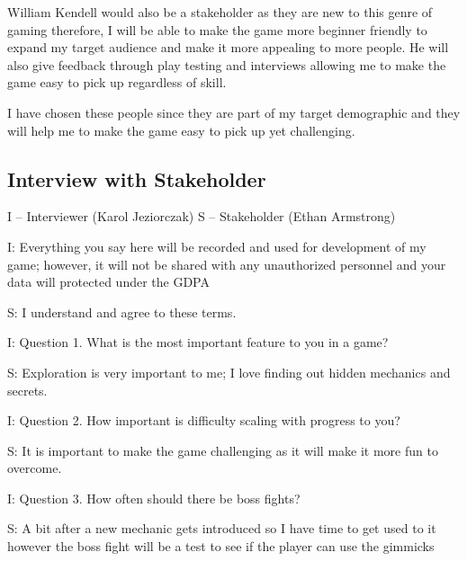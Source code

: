 \documentclass{article}
\newcommand{\parBr}{\vspace{5mm}}%
\begin{document}
\parBr

William Kendell would also be a stakeholder as they are new to this genre of gaming therefore, I will be able to make the game more beginner friendly to expand my target audience and make it more appealing to more people. He will also give feedback through play testing and interviews allowing me to make the game easy to pick up regardless of skill. 

\parBr

I have chosen these people since they are part of my target demographic and they will help me to make the game easy to pick up yet challenging.

\subsection{Interview with Stakeholder}
\begin{flushleft}
I – Interviewer (Karol Jeziorczak) \linebreak
S – Stakeholder (Ethan Armstrong) 
\end{flushleft} 

\parBr

I: Everything you say here will be recorded and used for development of my game; however, it will not be shared with any unauthorized personnel and your data will protected under the GDPA 

\parBr

S: I understand and agree to these terms. 

\parBr

I: Question 1. What is the most important feature to you in a game? 

\parBr

S: Exploration is very important to me; I love finding out hidden mechanics and secrets. 

\parBr

I: Question 2. How important is difficulty scaling with progress to you? 

\parBr

S: It is important to make the game challenging as it will make it more fun to overcome. 

\parBr

I: Question 3. How often should there be boss fights? 

\parBr

S: A bit after a new mechanic gets introduced so I have time to get used to it however the boss fight will be a test to see if the player can use the gimmicks 
\end{document}
